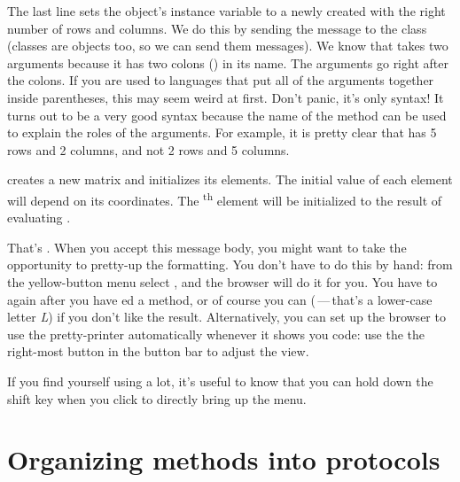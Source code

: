 \documentclass[a4paper,10pt,twoside]{book}
\begin{document}
The last line sets the  object's instance variable  to a newly created  with the right number of rows and columns.   We do this by sending the message  to the  class (classes are objects too, so we can send them messages).  We know that  takes two arguments because it has two colons (\ct{:}) in its name.   The arguments go right after the colons.
If you are used to languages that put all of the arguments together inside parentheses, this may seem weird at first.  Don't panic, it's only syntax!
It turns out to be a very good syntax because the name of the method can be used to explain the roles of the arguments.  For example, it is pretty clear that  has 5 rows and 2 columns, and not 2 rows and 5 columns.

 creates a new  matrix and initializes its elements.  The initial value of each element will depend on its coordinates.  The \textsuperscript{th} element will be initialized to the result of evaluating .  

That's .  When you accept this message body, you might want to take the opportunity to pretty-up the formatting.  You don't have to do this by hand: from the yellow-button menu select , and the browser will do it for you.  You have to  again after you have ed a method, or of course you can  
(\,---\,that's a lower-case letter \emph{L}) if you don't like the result.
Alternatively, you can set up the browser to use the pretty-printer automatically whenever it shows you code: use the the right-most button in the button bar to adjust the view.

If you find yourself using  a lot, it's useful to know that you can hold down the {\sc shift} key when you click to directly bring up the  menu.

\section{Organizing methods into protocols}
\end{document}
